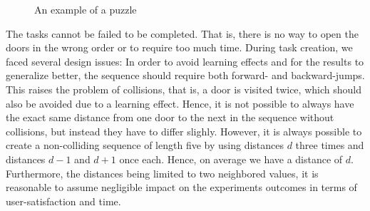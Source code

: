 \documentclass{sig-alternate-05-2015}
\begin{document}
\begin{figure}
  \caption{An example of a puzzle}
\end{figure}
The tasks cannot be failed to be completed. That is, there is no way to open the doors in the wrong order or to require too much time.
During task creation, we faced several design issues: In order to avoid learning effects and for the results to generalize better, 
the sequence should require both forward- and backward-jumps. This raises the problem of collisions, that is, a door is visited twice, which
should also be avoided due to a learning effect. Hence, it is not possible to always have the exact same distance from one door to the
next in the sequence without collisions, but instead they have to differ slighly. However, it is always possible to create a non-colliding sequence of
length five by using distances $d$ three times and distances $d - 1$ and $d + 1$ once each. Hence, on average we have a distance of $d$. 
Furthermore, the distances being limited to two neighbored values, it is reasonable to assume negligible
impact on the experiments outcomes in terms of user-satisfaction and time.
\end{document}
